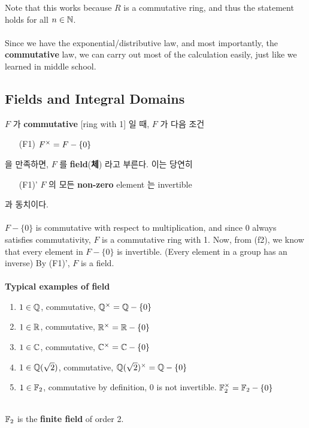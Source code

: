 Note that this works because $R$ is a commutative ring, and thus the statement holds for all $n\in \mathbb{N}$.\\
\\
 Since we have the exponential/distributive law, and most importantly, the \textbf{commutative} law, we can carry out most of the calculation easily, just like we learned in middle school.\\

\subsection{Fields and Integral Domains}
 $F$ 가 \textbf{commutative} [ring with 1] 일 때, $F$ 가 다음 조건
\begin{enumerate}
	\item[{\sffamily (F1)}] $F^\times = F - \{0\}$
\end{enumerate}
을 만족하면, $F$ 를 \textbf{field}(\textbf{체}) 라고 부른다. 이는 당연히
\begin{enumerate}
	\item[\sffamily (F1)'] $F$ 의 모든 \textbf{non-zero} element 는 invertible
\end{enumerate}
과 동치이다.\\
\\
 $F - \{0\}$ is commutative with respect to multiplication, and since $0$ always satisfies commutativity, $F$ is a commutative ring with 1. Now, from {\sffamily (f2)}, we know that every element in $F - \{0\}$ is invertible. (Every element in a group has an inverse) By {\sffamily (F1)'}, $F$ is a field.\\
\\
 \textbf{Typical examples of field}
\begin{enumerate} 
	\item $1\in \mathbb{Q}$, commutative, $\mathbb{Q}^\times = \mathbb{Q} - \{0\}$
	\item $1\in \mathbb{R}$, commutative, $\mathbb{R}^\times = \mathbb{R} - \{0\}$
	\item $1\in \mathbb{C}$, commutative, $\mathbb{C}^\times = \mathbb{C} - \{0\}$
	\item $1\in \mathbb{Q}(\sqrt{2})$, commutative, $\mathbb{Q}(\sqrt{2})^\times = \mathbb{Q} - \{0\}$
	\item $1\in \mathbb{F}_2$, commutative by definition, 0 is not invertible. $\mathbb{F}_2^\times = \mathbb{F}_2 - \{0\}$
\end{enumerate}~
\\
$\mathbb{F}_2$ is the \textbf{finite field} of order 2.\\
\\
